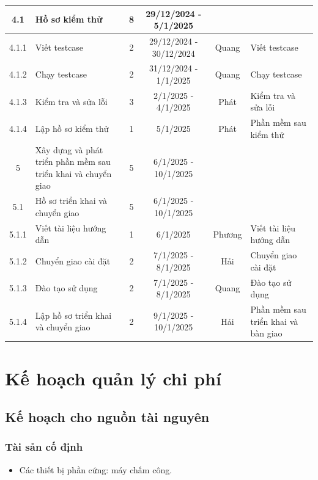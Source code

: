\begin{longtable}{|c|p{3cm}|c|c|c|p{2.8cm}|}
    4.1 & Hồ sơ kiểm thử & 8 & 29/12/2024 - 5/1/2025 & \hspace{0pt} & \hspace{0pt}\\ \hline
    4.1.1 & Viết testcase & 2 & 29/12/2024 - 30/12/2024 & Quang & Viết testcase \\ \hline
    4.1.2 & Chạy testcase & 2 & 31/12/2024 - 1/1/2025 & Quang & Chạy testcase \\ \hline
    4.1.3 & Kiểm tra và sửa lỗi & 3 & 2/1/2025 - 4/1/2025 & Phát & Kiểm tra và sửa lỗi \\ \hline
    4.1.4 & Lập hồ sơ kiểm thử & 1 & 5/1/2025 & Phát & Phần mềm sau kiểm thử \\ \hline
    5 & Xây dựng và phát triển phần mềm sau triển khai và chuyển giao & 5 & 6/1/2025 - 10/1/2025 & \hspace{0pt} & \hspace{0pt}\\ \hline
    5.1 & Hồ sơ triển khai và chuyển giao & 5 & 6/1/2025 - 10/1/2025 & \hspace{0pt} & \hspace{0pt}\\ \hline
    5.1.1 & Viết tài liệu hướng dẫn & 1 & 6/1/2025 & Phương & Viết tài liệu hướng dẫn \\ \hline
    5.1.2 & Chuyển giao cài đặt & 2 & 7/1/2025 - 8/1/2025 & Hải & Chuyển giao cài đặt \\ \hline
    5.1.3 & Đào tạo sử dụng & 2 & 7/1/2025 - 8/1/2025 & Quang & Đào tạo sử dụng \\ \hline
    5.1.4 & Lập hồ sơ triển khai và chuyển giao & 2 & 9/1/2025 - 10/1/2025 & Hải & Phần mềm sau triển khai và bàn giao \\ \hline
\end{longtable}

\section{Kế hoạch quản lý chi phí}
\subsection{Kế hoạch cho nguồn tài nguyên}
\subsubsection{Tài sản cố định}
\begin{itemize}
    \item Các thiết bị phần cứng: máy chấm công.
\end{itemize}

